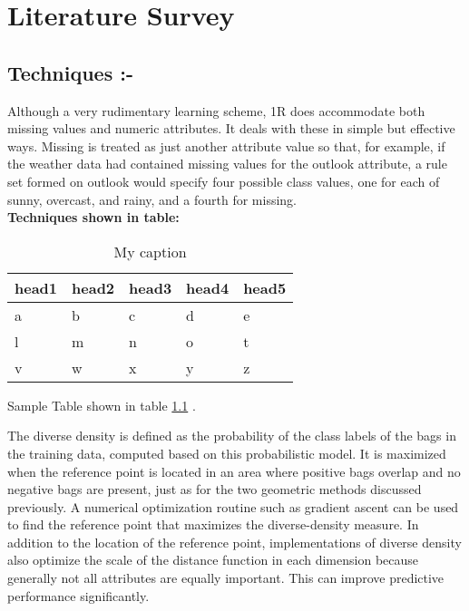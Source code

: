 \chapter{Literature Survey}

\section{Techniques  :-} 

Although a very rudimentary learning scheme, 1R does accommodate both missing
values and numeric attributes. It deals with these in simple but effective ways.
Missing is treated as just another attribute value so that, for example, if the weather
data had contained missing values for the outlook attribute, a rule set formed on
outlook would specify four possible class values, one for each of sunny, overcast,
and rainy, and a fourth for missing.\\



{\bf Techniques shown in table:\cite{k3} }


\begin{table}[h]
\centering
\begin{tabular}{|l|l|l|l|l|}
\hline
\multicolumn{1}{|c|}{\textbf{head1}} & \multicolumn{1}{c|}{\textbf{head2}} & \multicolumn{1}{c|}{\textbf{head3}} & \multicolumn{1}{c|}{\textbf{head4}} & \multicolumn{1}{c|}{\textbf{head5}} \\ \hline
a & b & c & d & e \\ \hline
l & m & n & o & t \\ \hline
v & w & x & y & z \\ \hline
\end{tabular}
\caption{My caption}
\label{my-label}
\end{table}


Sample Table shown in table \ref{my-label} .

The diverse density is defined as the probability of the class labels of the bags
in the training data, computed based on this probabilistic model. It is maximized
when the reference point is located in an area where positive bags overlap and no
negative bags are present, just as for the two geometric methods discussed previously.
A numerical optimization routine such as gradient ascent can be used to find
the reference point that maximizes the diverse-density measure. In addition to the
location of the reference point, implementations of diverse density also optimize the
scale of the distance function in each dimension because generally not all attributes
are equally important. This can improve predictive performance significantly.\\


